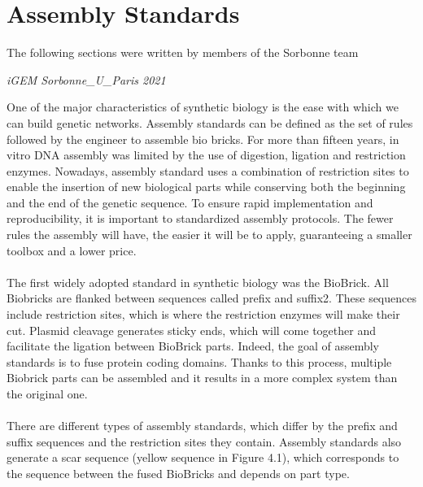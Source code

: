 

\section{Assembly Standards}
\epigraph{The following sections were written by members of the Sorbonne team}{\textit{iGEM Sorbonne\_U\_Paris 2021}}
\noindent
One of the major characteristics of synthetic biology is the ease with which we can build genetic networks. Assembly standards can be defined as the set of rules followed by the engineer to assemble bio bricks. For more than fifteen years, in vitro DNA assembly was limited by the use of digestion, ligation and restriction enzymes. Nowadays, assembly standard uses a combination of restriction sites to enable the insertion of new biological parts while conserving both the beginning and the end of the genetic sequence. To ensure rapid implementation and reproducibility, it is important to standardized assembly protocols. The fewer rules the assembly will have, the easier it will be to apply, guaranteeing a smaller toolbox and a lower price. \\ \\
The first widely adopted standard in synthetic biology was the BioBrick. All Biobricks are flanked between sequences called prefix and suffix2. These sequences include restriction sites, which is where the restriction enzymes will make their cut. Plasmid cleavage generates sticky ends, which will come together and facilitate the ligation between BioBrick parts. Indeed, the goal of assembly standards is to fuse protein coding domains. Thanks to this process, multiple Biobrick parts can be assembled and it results in a more complex system than the original one. \\ \\
There are different types of assembly standards, which differ by the prefix and suffix sequences and the restriction sites they contain. Assembly standards also generate a scar sequence (yellow sequence in Figure 4.1), which corresponds to the sequence between the fused BioBricks and depends on part type. 

